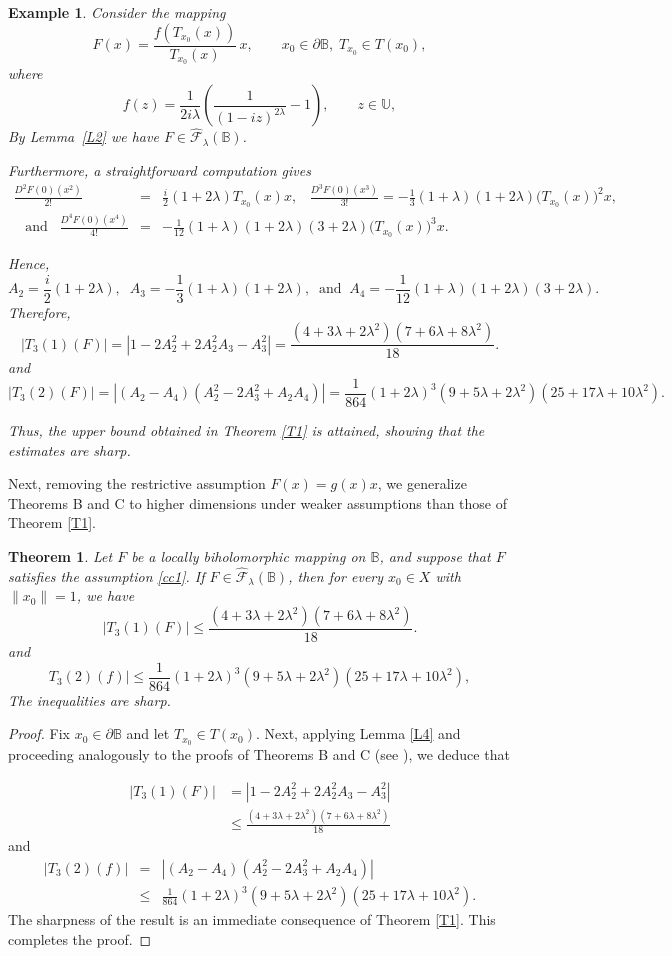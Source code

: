 \documentclass[11pt, reqno]{amsart}
\newtheorem{theo}{Theorem}[section]
\newtheorem{exm}{Example}[section]
\numberwithin{equation}{section}
\newcommand{\beas}{\begin{eqnarray*}}
\newcommand{\eeas}{\end{eqnarray*}}
\begin{document}
\begin{exm}
Consider the mapping
\[
F(x)=
\frac{f\!\left(T_{x_0}(x)\right)}{T_{x_0}(x)}\,x,
\qquad
x_0\in\partial\mathbb{B},\;
T_{x_0}\in T(x_0),
\]
where
\[
f(z)=\frac{1}{2i\lambda}\left(\frac{1}{(1-iz)^{2\lambda}}-1\right),
\qquad z\in\mathbb{U},
\]
By Lemma~\ref{L2} we have $F\in \widehat{\mathcal{F}}_{\lambda}(\mathbb{B})$. 


Furthermore, a straightforward computation gives
\beas
\frac{D^2F(0)(x^2)}{2!}&=&\frac{i}{2}(1+2\lambda)T_{x_0}(x)x,\;\;\;
\frac{D^3F(0)(x^3)}{3!}
=-\frac{1}{3}(1+\lambda)(1+2\lambda)\bigl(T_{x_0}(x)\bigr)^2x,\\
\;\;\;\text{and}\;\;\;
\frac{D^4F(0)(x^4)}{4!}&=&-\frac{1}{12}(1+\lambda)(1+2\lambda)(3+2\lambda)\bigl(T_{x_0}(x)\bigr)^3x.
\eeas

Hence,
\[
A_2=\frac{i}{2}(1+2\lambda),\;\;
A_3=-\frac{1}{3}(1+\lambda)(1+2\lambda),\;\;\text{and}\;\;
A_4=-\frac{1}{12}(1+\lambda)(1+2\lambda)(3+2\lambda).
\]
Therefore,
\[
|T_{3}(1)(F)|
=
\left|1-2A_2^2+2A_2^2A_3-A_3^2\right|
=\frac{(4+3\lambda+2\lambda^2)(7+6\lambda+8\lambda^2)}{18}.\]
and 
\[
|T_{3}(2)(F)|
=
\left|(A_2-A_4)(A_2^2-2A_3^2+A_2A_4)\right|
=\frac{1}{864}(1+2\lambda)^3(9+5\lambda+2\lambda^2)(25+17\lambda+10\lambda^2).\]

Thus, the upper bound obtained in Theorem \ref{T1} is attained, showing that the estimates are sharp.
\end{exm}
Next, removing the restrictive assumption $F(x)=g(x)x$, we generalize Theorems B and C to higher dimensions under weaker assumptions than those of Theorem \ref{T1}. 
\begin{theo}\label{T2}
Let $F$ be a locally biholomorphic mapping on $\mathbb{B}$, and suppose that $F$ satisfies the assumption \eqref{cc1}. If $F\in \widehat{\mathcal{F}}_{\lambda}(\mathbb{B})$, then for every $x_0\in X$ with $\|x_0\|=1$, we have
\[
|T_{3}(1)(F)|\leq  \frac{(4+3\lambda+2\lambda^2)(7+6\lambda+8\lambda^2)}{18}.
\]
and 
 \[ T_3(2)(f)|\leq \frac{1}{864}(1+2\lambda)^3(9+5\lambda+2\lambda^2)(25+17\lambda+10\lambda^2),
\]
 The inequalities are sharp.
\end{theo}
\begin{proof} Fix $x_0\in \partial{\mathbb{B}}$ and let $T_{x_0}\in T(x_0)$. Next, applying Lemma \ref{L4} and proceeding analogously to the proofs of Theorems B and C (see \cite[Theorems 4.1 and 4.3]{ALT2022}), we deduce that

\begin{align*}
|T_{3}(1)(F)|
&=|1-2A_2^2+2A_2^2A_3-A_3^2|\\
&\leq \frac{(4+3\lambda+2\lambda^2)(7+6\lambda+8\lambda^2)}{18}
\end{align*}
and 
\beas |T_3(2)(f)| &=& \left|(A_2-A_4)(A_2^2-2A_3^2+A_2A_4)\right|\\
&\leq & \frac{1}{864}(1+2\lambda)^3(9+5\lambda+2\lambda^2)(25+17\lambda+10\lambda^2).
\eeas
 The sharpness of the result is an immediate consequence of Theorem \ref{T1}. This completes the proof.\end{proof}
 
\end{document}
